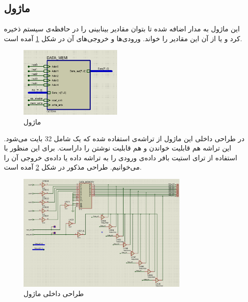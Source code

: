 \documentclass[12pt,onecolumn,a4paper,fleqn]{article}
\begin{document}
\subsection{ماژول }
این ماژول به مدار اضافه شده تا بتوان مقادیر بینابینی را در حافظه‌ی سیستم ذخیره کرد و یا از آن این مقادیر را خواند. ورودی‌ها و خروجی‌های آن در شکل \ref{fig:datamem} آمده است.
\begin{figure}[H]
	\centering
	\includegraphics[width=0.45\textwidth]{source/datamem_interface.png}
	\caption{ماژول }
	\label{fig:datamem}
\end{figure}
در طراحی داخلی این ماژول از تراشه‌ی  استفاده شده که یک  شامل 32 بایت می‌شود. این تراشه هم قابلیت خواندن و هم قابلیت نوشتن را داراست. برای این منظور با استفاده از ترای استیت بافر داده‌ی ورودی را به تراشه داده یا داده‌ی خروجی آن را می‌خوانیم. طراحی مذکور در شکل \ref{fig:datamem_inner} آمده است.
\begin{figure}[H]
	\centering
	\includegraphics[width=0.75\textwidth]{source/datamem_inner.png}
	\caption{طراحی داخلی ماژول }
	\label{fig:datamem_inner}
\end{figure}
\end{document}
